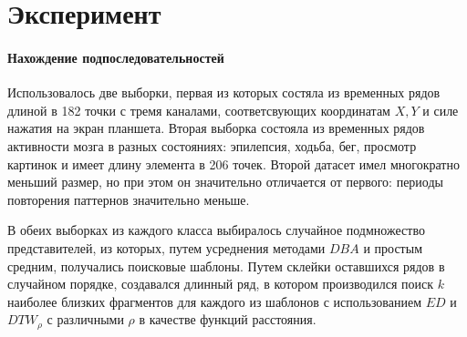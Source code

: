 \documentclass[12pt,twoside]{article}
\begin{document}
									
    \section{Эксперимент}

        \paragraph{Нахождение подпоследовательностей}
        Использовалось две выборки, первая из которых состяла из временных рядов длиной в 182 точки с тремя каналами, соответсвующих координатам $X, Y$ 
            и силе нажатия на экран планшета.
        Вторая выборка состояла из временных рядов активности мозга в разных состояниях: эпилепсия, ходьба, бег, просмотр картинок и имеет длину элемента в 206 точек.
        Второй датасет имел многократно меньший размер, но при этом он значительно отличается от первого: периоды повторения паттернов значительно меньше.

        В обеих выборках из каждого класса выбиралось случайное подмножество представителей, из которых,
            путем усреднения методами $DBA$ и простым средним, получались поисковые шаблоны. 
        Путем склейки оставшихся рядов в случайном порядке, создавался длинный ряд, в котором производился поиск $k$ наиболее близких фрагментов 
            для каждого из шаблонов с использованием $ED$ и $DTW_\rho$ с различными $\rho$ в качестве функций расстояния.
\end{document}
